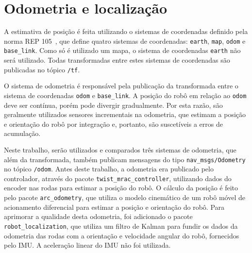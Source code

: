 \documentclass[repeatfields,xlists,xpacks,oneside,yearsonly]{ufrgscca}
\begin{document}
\section{Odometria e localização}


A estimativa de posição é feita utilizando o sistemas de coordenadas definido pela
norma REP 105~\cite{rep_105}, que define quatro sistemas de coordenadas: \texttt{earth}, 
\texttt{map}, \texttt{odom} e \texttt{base\_link}.
Como só é utilizado um mapa, o sistema de coordenadas \texttt{earth} não será utilizado.
Todas transformadas entre estes sistemas de coordenadas são
publicadas no tópico \texttt{/tf}.

O sistema de odometria é responsável pela publicação da transformada entre o sistema
de coordenadas \texttt{odom} e \texttt{base\_link}. 
A posição do robô em relação ao \texttt{odom} deve ser contínua, porém pode divergir
gradualmente. Por esta razão, são geralmente utilizados sensores incrementais na 
odometria, que estimam a posição e orientação do robô por integração e, portanto,
são suscetíveis a erros de acumulação.

Neste trabalho, serão utilizados e comparados três sistemas de odometria, 
que além da transformada, também publicam mensagens do tipo 
\texttt{nav\_msgs/Odometry} no tópico \texttt{/odom}.
Antes deste trabalho, a odometria era publicado pelo controlador,
através do pacote \texttt{twist\_mrac\_controller}, utilizando 
dados do encoder nas rodas para estimar a posição do robô.
O cálculo da posição é feito pelo pacote \texttt{arc\_odometry}, que utiliza
o modelo cinemático de um robô móvel de acionamento diferencial 
para estimar a posição e orientação do robô.
Para aprimorar a qualidade desta odometria, foi adicionado o pacote 
\texttt{robot\_localization}, que utiliza um filtro de Kalman para 
fundir os dados da odometria das rodas com a orientação e velocidade
angular do robô, fornecidos pelo IMU. A aceleração linear do IMU não
foi utilizada.
\end{document}
